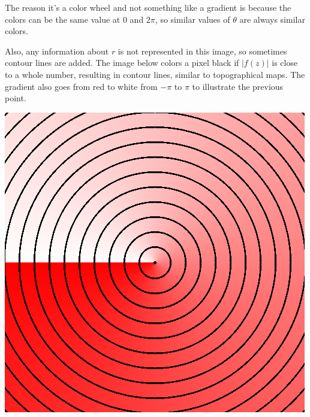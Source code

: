 \documentclass[xhtml, mathjax]{article}
\begin{document}
  The reason it's a color wheel and not something like a gradient is because the
  colors can be the same value at $0$ and $2\pi$, so similar values of $\theta$
  are always similar colors.

  Also, any information about $r$ is not represented in this image, so sometimes
  contour lines are added. The image below colors a pixel black if $|f(z)|$ is
  close to a whole number, resulting in contour lines, similar to topographical
  maps. The gradient also goes from red to white from $-\pi$ to $\pi$ to illustrate
  the previous point.

  \begin{center}
    \includegraphics{z_contour.gif}
  \end{center}
\end{document}
